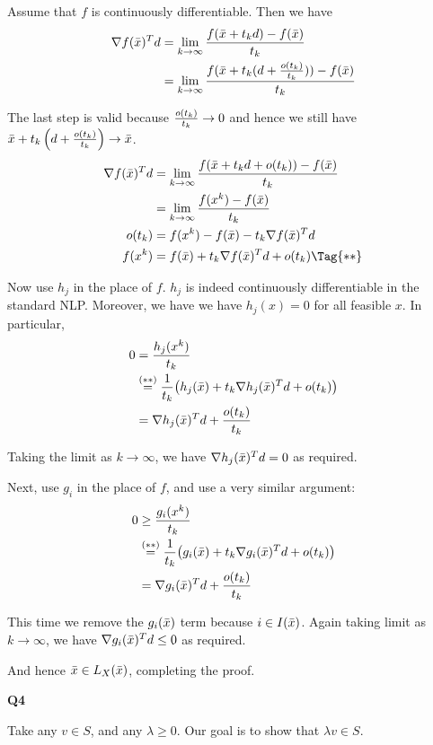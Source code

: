 Assume that $f$ is continuously differentiable. Then we have
\begin{align*}
	\nabla f(\bar x)^Td
	 & = \lim_{k\to\infty}\frac{f(\bar x+t_kd)-f(\bar x)}{t_k}                   \\
	 & = \lim_{k\to\infty}\frac{f(\bar x+t_k(d+\frac{o(t_k)}{t_k}))-f(\bar x)}{t_k}
\end{align*}

The last step is valid because $\frac{o(t_k)}{t_k}\to0$ and hence we
still have $\bar x+t_k\left(d+\frac{o(t_k)}{t_k}\right)\to\bar x$.
\begin{align*}
	\nf(\bx)^Td
	       & =\lk\f{f(\bx+t_kd+o(t_k))-f(\bx)}{t_k} \\
	       & =\lk\f{f(x^k)-f(\bx)}{t_k}             \\
	o(t_k) & =f(x^k)-f(\bx)-t_k\nf(\bx)^Td          \\
	f(x^k) & =f(\bx)+t_k\nf(\bx)^Td+o(t_k)\Tag{**}
\end{align*}

Now use $h_j$ in the place of $f$. $h_j$ is indeed continuously
differentiable in the standard NLP. Moreover, we have we have
$h_j(x)=0$ for all feasible $x$. In particular,
\begin{align*} 0
	 & = \frac{h_j(x^k)}{t_k}                                                \\
	 & \stackrel{(**)}{=}\frac1{t_k}\big(h_j(\bar x)+t_k\nabla h_j(\bar x)^Td+o(t_k)\big) \\
	 & = \nabla h_j(\bar x)^Td+\frac{o(t_k)}{t_k}
\end{align*}

Taking the limit as $k\to\infty$, we have $\nabla h_j(\bar x)^Td=0$ as
required.

Next, use $g_i$ in the place of $f$, and use a very similar argument:
\begin{align*} 0
	 & \geq\frac{g_i(x^k)}{t_k}                                              \\
	 & \stackrel{(**)}{=}\frac1{t_k}\big(g_i(\bar x)+t_k\nabla g_i(\bar x)^Td+o(t_k)\big) \\
	 & =\nabla g_i(\bar x)^Td+\frac{o(t_k)}{t_k}
\end{align*}

This time we remove the $g_i(\bar x)$ term because $i\in I(\bar x)$. Again
taking limit as $k\to\infty$, we have $\nabla g_i(\bar x)^Td\leq0$ as
required.

And hence $\bar x\in L_X(\bar x)$, completing the proof.

\newpage
{\large\textbf{Q4}}

Take any $v\in S$, and any $\lambda\geq0$. Our goal is to show that
$\lambda v\in S$.

